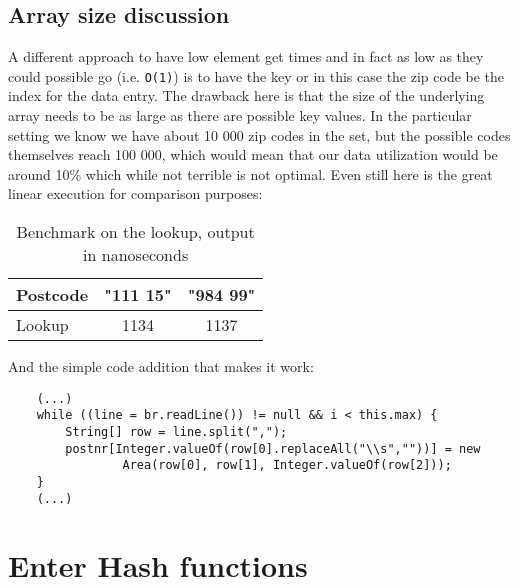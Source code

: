 \documentclass[a4paper,11pt]{article}
\begin{document}
\subsection*{Array size discussion}

A different approach to have low element get times and in fact as low as they could possible go (i.e. {\tt O(1)}) is to have the key or in this case the zip code be the index for the data entry. The drawback here is that the size of the underlying array needs to be as large as there are possible key values. In the particular setting we know we have about 10 000 zip codes in the set, but the possible codes themselves reach 100 000, which would mean that our data utilization would be around 10\% which while not terrible is not optimal. Even still here is the great linear execution for comparison purposes:

\begin{table}[H]
\begin{center}
\begin{tabular}{l|c|c}
\textbf{Postcode} & \textbf{"111 15"} & \textbf{"984 99"}\\
\hline
  Lookup      &  1134 &     1137 \\
\end{tabular}
\caption{Benchmark on the lookup, output in nanoseconds}
\label{tab:table1}
\end{center}
\end{table}

And the simple code addition that makes it work:

\begin{verbatim}
    (...)
    while ((line = br.readLine()) != null && i < this.max) {
        String[] row = line.split(",");
        postnr[Integer.valueOf(row[0].replaceAll("\\s",""))] = new 
                Area(row[0], row[1], Integer.valueOf(row[2]));
    }
    (...)
\end{verbatim}

\section*{Enter Hash functions}
\end{document}
